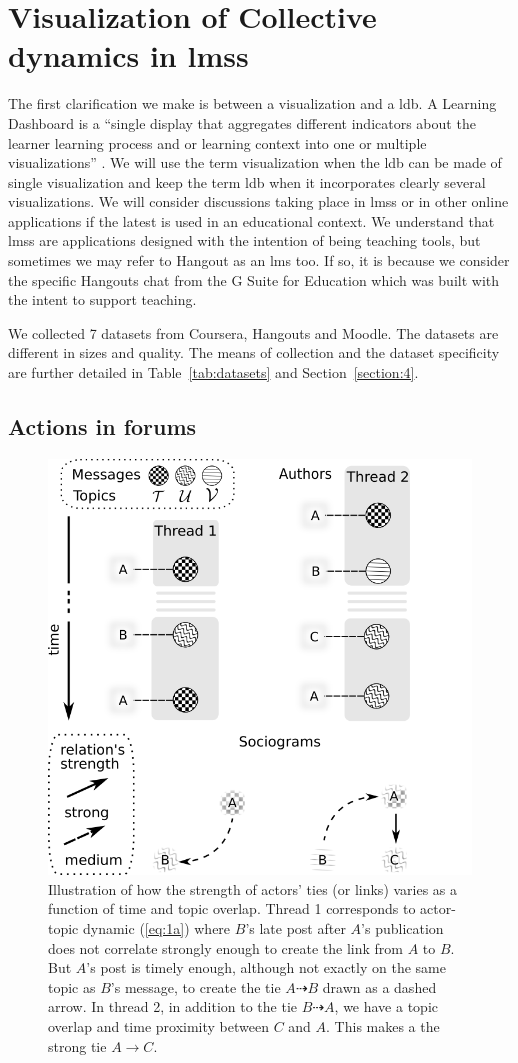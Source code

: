 \documentclass[a4paper,twoside]{article}
\begin{document}
\section{Visualization of Collective dynamics in \glspl{lms}}
\label{section:2}

The first clarification we make is between a visualization and a \gls{ldb}.  A Learning Dashboard is a ``single display that aggregates different indicators about the learner learning process and or learning context into one or multiple visualizations'' \citep{Schwendimann2017}.  We will use the term visualization when the \gls{ldb} can be made of single visualization and keep the term \gls{ldb} when it incorporates clearly several visualizations.  
We will consider discussions taking place in \glspl{lms} or in other online applications if the latest is used in an educational context.  We understand that \glspl{lms} are applications designed with the intention of being teaching tools, but sometimes we may refer to Hangout as an \gls{lms} too.   If so, it is because we consider the specific Hangouts chat from the G Suite for Education which was built with the intent to support teaching.

We collected 7 datasets from Coursera, Hangouts and Moodle.  The datasets are different in sizes and quality.  The means of collection and the dataset specificity are further detailed in Table~\ref{tab:datasets} and Section~\ref{section:4}.  

\subsection{Actions in forums}

\begin{figure}[b]
  \small{
    \caption{\label{fig:discussion}
      Illustration of how the strength of actors' ties (or links) varies as a function of time and topic overlap.  Thread 1 corresponds to actor-topic dynamic (\ref{eq:1a}) where $B$'s late post after $A$'s  publication does not correlate strongly enough to create the link from $A$ to $B$. But $A$'s  post is timely enough, although not exactly on the same topic as $B$'s message, to create the tie $A \dashrightarrow B$ drawn as a dashed arrow.  In thread 2, in addition to the tie $B \dashrightarrow A$, we have a topic overlap and time proximity between $C$ and $A$.  This makes a the strong tie $A \to C$.
    }}
  \centering
  \includegraphics[width=.45\textwidth]{images/discussion.png}
\end{figure}
\end{document}
